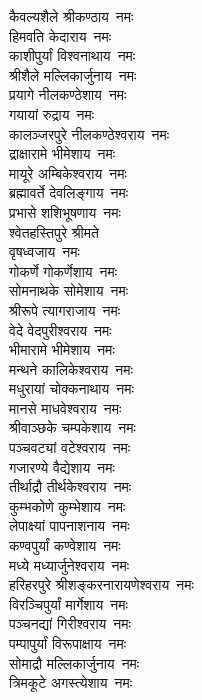 \begin{multicols}{2}
\begin{flushleft}
कैवल्यशैले श्रीकण्ठाय~नमः\\
हिमवति केदाराय~नमः\\
काशीपुर्यां विश्वनाथाय~नमः\\
श्रीशैले मल्लिकार्जुनाय~नमः\\
प्रयागे नीलकण्ठेशाय~नमः\\
गयायां रुद्राय~नमः\\
कालञ्जरपुरे नीलकण्ठेश्वराय~नमः\\
द्राक्षारामे भीमेशाय~नमः\\
मायूरे अम्बिकेश्वराय~नमः\\
ब्रह्मावर्ते देवलिङ्गाय~नमः\hfill{}\\
प्रभासे शशिभूषणाय~नमः\\
श्वेतहस्तिपुरे श्रीमते\\ वृषध्वजाय~नमः\\
गोकर्णे गोकर्णेशाय~नमः\\
सोमनाथके सोमेशाय~नमः\\
श्रीरूपे त्यागराजाय~नमः\\
वेदे वेदपुरीश्वराय~नमः\\
भीमारामे भीमेशाय~नमः\\
मन्थने कालिकेश्वराय~नमः\\
मधुरायां चोक्कनाथाय~नमः\\
मानसे माधवेश्वराय~नमः\hfill{}\\
श्रीवाञ्छके चम्पकेशाय~नमः\\
पञ्चवट्यां वटेश्वराय~नमः\\
गजारण्ये वैद्येशाय~नमः\\
तीर्थाद्रौ तीर्थकेश्वराय~नमः\\
कुम्भकोणे कुम्भेशाय~नमः\\
लेपाक्ष्यां पापनाशनाय~नमः\\
कण्वपुर्यां कण्वेशाय~नमः\\
मध्ये मध्यार्जुनेश्वराय~नमः\\
हरिहरपुरे श्रीशङ्करनारायणेश्वराय~नमः\\
विरञ्चिपुर्यां मार्गेशाय~नमः\hfill{}\\
पञ्चनद्यां गिरीश्वराय~नमः\\
पम्पापुर्यां विरूपाक्षाय~नमः\\
सोमाद्रौ मल्लिकार्जुनाय~नमः\\
त्रिमकूटे अगस्त्येशाय~नमः\\

\end{flushleft}
\end{multicols}
